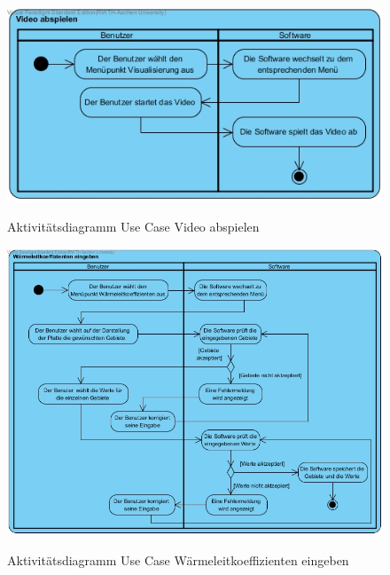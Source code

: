 \begin{figure}[H]
	\centering
	\includegraphics[scale=.5]{Bilder/Video_abspielen.jpg}\\
	\caption{Aktivitätsdiagramm Use Case Video abspielen}
	\label{Aktivitätsdiagramm Use Case Video abspielen}
\end{figure}

\begin{figure}[H]
	\centering
	\includegraphics[scale=.5]{Bilder/Waermeleitkoeffizienten_eingeben.jpg}\\
	\caption{Aktivitätsdiagramm Use Case Wärmeleitkoeffizienten eingeben}
	\label{Aktivitätsdiagramm Use Case Wärmeleitkoeffizienten eingeben}
\end{figure}

